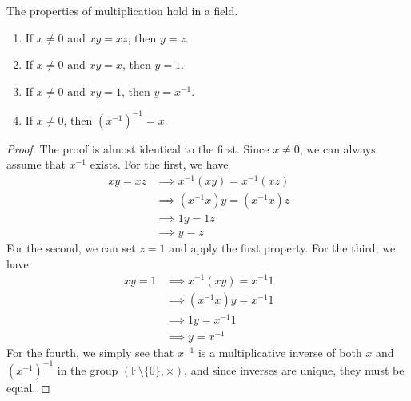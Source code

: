   \begin{lemma}
    \label{thm:properties-of-multiplication}
    The properties of multiplication hold in a field. 
    \begin{enumerate}
      \item If $x \neq 0$ and $xy = xz$, then $y = z$. 
      \item If $x \neq 0$ and $xy = x$, then $y = 1$. 
      \item If $x \neq 0$ and $xy = 1$, then $y = x^{-1}$. 
      \item If $x \neq 0$, then $(x^{-1})^{-1} = x$. 
    \end{enumerate}
  \end{lemma}
  \begin{proof}
    The proof is almost identical to the first. Since $x \neq 0$, we can always assume that $x^{-1}$ exists. For the first, we have
    \begin{align}
      x y = x z & \implies x^{-1} (x y) = x^{-1} (x z) && \tag{multiplication is a function} \\
                & \implies (x^{-1} x) y = (x^{-1} x) z && \tag{$\times$ is associative} \\
                & \implies 1 y = 1 z && \tag{definition of multiplicative inverse} \\  
                & \implies y = z && \tag{definition of identity}
    \end{align}
    For the second, we can set $z = 1$ and apply the first property. For the third, we have 
    \begin{align}
      xy = 1 & \implies x^{-1} (x y) = x^{-1} 1 && \tag{multiplication is a function} \\
             & \implies (x^{-1} x) y = x^{-1} 1 && \tag{$\times$ is associative} \\
             & \implies 1 y = x^{-1} 1 && \tag{definition of multiplicative inverse} \\
             & \implies y = x^{-1} && \tag{definition of identity}
    \end{align}
    For the fourth, we simply see that $x^{-1}$ is a multiplicative inverse of both $x$ and $(x^{-1})^{-1}$ in the group $(\mathbb{F} \setminus \{0\}, \times)$, and since inverses are unique, they must be equal. 
  \end{proof}


